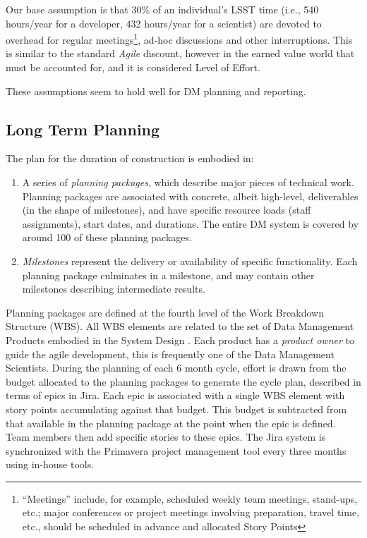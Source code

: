 Our base assumption is that 30\% of an individual's LSST time (i.e., 540 hours/year for a developer, 432 hours/year for a scientist) are devoted to overhead for regular meetings\footnote{``Meetings'' include, for example, scheduled weekly team meetings, stand-ups, etc.; major conferences or project meetings involving preparation, travel time, etc., should be scheduled in advance and allocated Story Points}, ad-hoc discussions and other interruptions.
This is similar to the standard \emph{Agile} discount, however in the earned value world that must be accounted for, and it is considered Level of Effort.

These assumptions seem to hold well for DM planning and reporting.


\subsection{Long Term Planning}
\label{sec:long-term-plan}

The plan for the duration of construction is embodied in:
\begin{enumerate}
\item
  A series of \emph{planning packages}, which describe major pieces of
  technical work. Planning packages are associated with concrete, albeit
  high-level, deliverables (in the shape of milestones), and have
  specific resource loads (staff assignments), start dates, and
  durations. The entire DM system is covered by around 100 of these
  planning packages.
\item
  \emph{Milestones} represent the delivery or availability of specific
  functionality. Each planning package culminates in a milestone, and
  may contain other milestones describing intermediate results.
\end{enumerate}

Planning packages are defined at the fourth level of the Work Breakdown Structure (WBS).
All WBS elements are related to the set of Data Management Products embodied in the System Design \cite{LDM-148}.
Each product has a \emph{product owner} to guide the agile development, this is frequently one of the Data Management Scientists.
During the planning of each 6 month cycle, effort is drawn from the budget allocated to the planning packages to generate the cycle plan, described in terms of epics in Jira.
Each epic is associated with a single WBS element  with story points accumulating against that budget.
This budget is subtracted from that available in the planning package at the point when the epic is defined.
Team members then add specific stories to these epics.
The Jira system is synchronized with the Primavera project management tool every three months using in-house tools.

